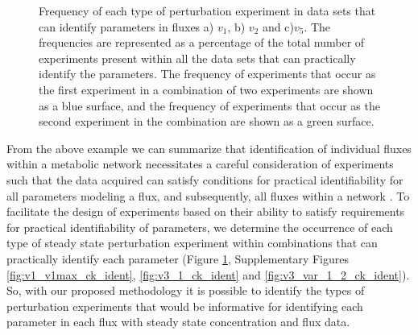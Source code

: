 \documentclass[10pt]{article}
\begin{document}
	\begin{figure}[!tbhp]
		\caption{Frequency of each type of perturbation experiment in data sets that can identify parameters in fluxes a) $v_1$, b) $v_2$ and c)$v_5$. The frequencies are represented as a percentage of the total number of experiments present within all the data sets that can practically identify the parameters. The frequency of experiments that occur as the first experiment in a combination of two experiments are shown as a blue surface, and the frequency of experiments that occur as the second experiment in the combination are shown as a green surface.}\label{fig:expinfo}
	\end{figure}
	
	From the above example we can summarize that identification of individual fluxes within a metabolic network necessitates a careful consideration of experiments such that the data acquired can satisfy conditions for practical identifiability for all parameters modeling a flux, and subsequently, all fluxes within a network \parencite{Heijnen2013}. To facilitate the design of experiments based on their ability to satisfy requirements for practical identifiability of parameters, we determine the occurrence of each type of steady state perturbation experiment within combinations that can practically identify each parameter (Figure \ref{fig:expinfo}, Supplementary Figures \ref{fig:v1_v1max_ck_ident},  \ref{fig:v3_1_ck_ident} and \ref{fig:v3_var_1_2_ck_ident}). So, with our proposed methodology it is possible to identify the types of perturbation experiments that would be informative for identifying each parameter in each flux with steady state concentration and flux data.
	
\end{document}
